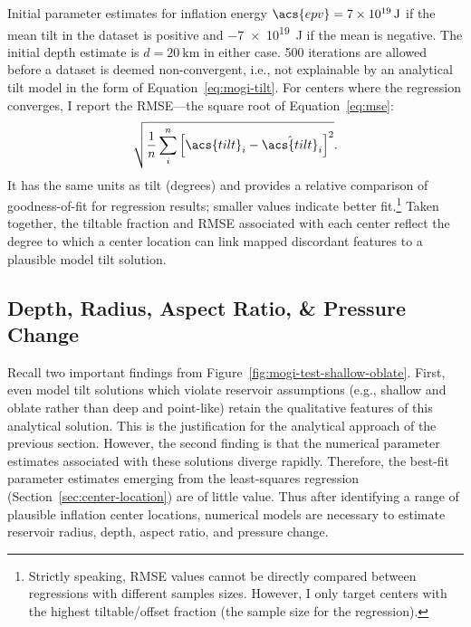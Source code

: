 Initial parameter estimates for inflation energy $\acs{epv} = \qty{7e19}{\J}$ if the mean tilt in the dataset is positive and \qty{-7e19}{\J} if the mean is negative. The initial depth estimate is $d = \qty{20}{\km}$ in either case. 500 iterations are allowed before a dataset is deemed non-convergent, i.e., not explainable by an analytical tilt model in the form of Equation~\eqref{eq:mogi-tilt}. For centers where the regression converges, I report the \ac{RMSE}---the square root of Equation~\eqref{eq:mse}:
\begin{equation}
    \sqrt{\frac{1}{n}\sum_{i}^{n}{\left[\acs{tilt}_i-\hat{\acs{tilt}}_i\right]}^2}.\label{eq:rmse}
\end{equation}
It has the same units as \acs{tilt} (degrees) and provides a relative comparison of goodness-of-fit for regression results; smaller values indicate better fit.\footnote{Strictly speaking, \acs{RMSE} values cannot be directly compared between regressions with different samples sizes. However, I only target centers with the highest tiltable/offset fraction (the sample size for the regression).} Taken together, the tiltable fraction and \ac{RMSE} associated with each center reflect the degree to which a center location can link mapped discordant features to a plausible model tilt solution.

\subsection{Depth, Radius, Aspect Ratio, \& Pressure Change}

Recall two important findings from Figure~\ref{fig:mogi-test-shallow-oblate}. First, even model tilt solutions which violate \textcite{mogi_relations_1958} reservoir assumptions (e.g., shallow and oblate rather than deep and point-like) retain the qualitative features of this analytical solution. This is the justification for the analytical approach of the previous section. However, the second finding is that the numerical parameter estimates associated with these solutions diverge rapidly. Therefore, the best-fit parameter estimates emerging from the least-squares regression (Section~\ref{sec:center-location}) are of little value. Thus after identifying a range of plausible inflation center locations, numerical models are necessary to estimate reservoir radius, depth, aspect ratio, and pressure change.

